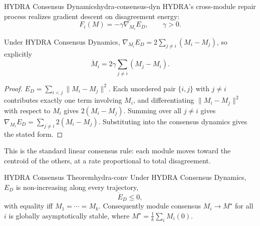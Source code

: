 \documentclass[12pt,twoside,openright]{book}
\newenvironment{prop}
{\begin{proposition}{}{}}
{\end{proposition}}
\begin{document}
\begin{definition}{HYDRA Consensus Dynamics}{hydra-consensus-dyn}
  HYDRA's cross-module repair process realizes gradient
  descent on disagreement energy:
  \[
    F_i(M) = -\gamma \nabla_{M_i} E_D, \qquad \gamma > 0.
  \]
\end{definition}

\begin{prop}
  Under HYDRA Consensus Dynamics,
  $\nabla_{M_i} E_D = 2\sum_{j \ne i}(M_i - M_j)$, so
  explicitly
  \[
    \dot{M}_i = 2\gamma \sum_{j \ne i}(M_j - M_i).
  \]
\end{prop}

\begin{proof}
  $E_D = \sum_{i<j} \|M_i - M_j\|^2$. Each unordered pair
  $\{i,j\}$ with $j \ne i$ contributes exactly one term
  involving $M_i$, and differentiating $\|M_i-M_j\|^2$ with
  respect to $M_i$ gives $2(M_i - M_j)$. Summing over all
  $j \ne i$ gives $\nabla_{M_i}E_D = \sum_{j\ne i}2(M_i-M_j)$.
  Substituting into the consensus dynamics gives the stated
  form.
\end{proof}

This is the standard linear consensus rule: each module
moves toward the centroid of the others, at a rate
proportional to total disagreement.

\begin{theorem}{HYDRA Consensus Theorem}{hydra-conv}
  Under HYDRA Consensus Dynamics, $E_D$ is non-increasing
  along every trajectory,
  \[
    \dot{E}_D \le 0,
  \]
  with equality iff $M_1 = \cdots = M_k$. Consequently
  module consensus $M_i \to M^\star$ for all $i$ is globally
  asymptotically stable, where
  $M^\star = \frac{1}{k}\sum_i M_i(0)$.
\end{theorem}
\end{document}
